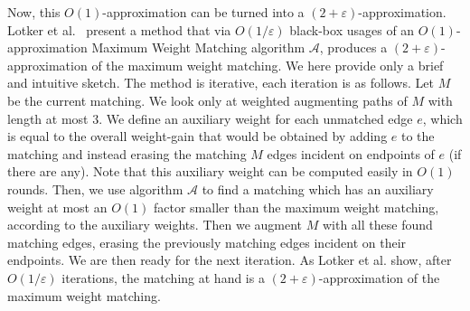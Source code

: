 \documentclass[11pt]{article}
\newcommand{\eps}{\varepsilon}
\begin{document}
Now, this $O(1)$-approximation can be turned into a $(2+\eps)$-approximation. Lotker et al.~\cite[Section 4]{lotkerMatchingImproved} present a method that via $O(1/\eps)$ black-box usages of an $O(1)$-approximation Maximum Weight Matching algorithm $\mathcal{A}$, produces a $(2+\eps)$-approximation of the maximum weight matching. We here provide only a brief and intuitive sketch. The method is iterative, each iteration is as follows. Let $M$ be the current matching. We look only at weighted augmenting paths of $M$ with length at most $3$. We define an auxiliary weight for each unmatched edge $e$, which is equal to the overall weight-gain that would be obtained by adding $e$ to the matching and instead erasing the matching $M$ edges incident on endpoints of $e$ (if there are any). Note that this auxiliary weight can be computed easily in $O(1)$ rounds. Then, we use algorithm $\mathcal{A}$ to find a matching which has an auxiliary weight at most an $O(1)$ factor smaller than the maximum weight matching, according to the auxiliary weights. Then we augment $M$ with all these found matching edges, erasing the previously matching edges incident on their endpoints. We are then ready for the next iteration. As Lotker et al. show, after $O(1/\eps)$ iterations, the matching at hand is a $(2+\eps)$-approximation of the maximum weight matching.
\end{document}
